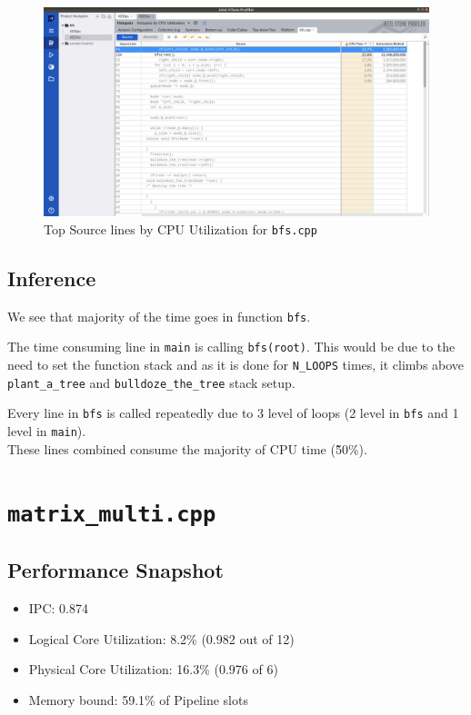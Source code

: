 \documentclass[11pt, swedish, openany]{book}
\begin{document}
\begin{figure}[H]
    \centering
    \includegraphics[scale=0.25]{vtune/bfs/sc.png}
    \caption{Top Source lines by CPU Utilization for \texttt{bfs.cpp}}
\end{figure}

\subsection*{Inference}
We see that majority of the time goes in function \texttt{bfs}.

The time consuming line in \texttt{main} is calling \texttt{bfs(root)}. This would be due to the need to set the function stack and as it is done for \texttt{N\_LOOPS} times, it climbs above \texttt{plant\_a\_tree} and \texttt{bulldoze\_the\_tree} stack setup.

Every line in \texttt{bfs} is called repeatedly due to 3 level of loops (2 level in \texttt{bfs} and 1 level in \texttt{main}). \\
These lines combined consume the majority of CPU time (\~50\%).


\newpage
\section{\texttt{matrix\_multi.cpp}}

\subsection*{Performance Snapshot}
\begin{itemize}
    \item IPC: 0.874
    \item Logical Core Utilization: 8.2\% (0.982 out of 12)
    \item Physical Core Utilization: 16.3\% (0.976 of 6)
    \item Memory bound: 59.1\% of Pipeline slots
\end{itemize}
\end{document}

